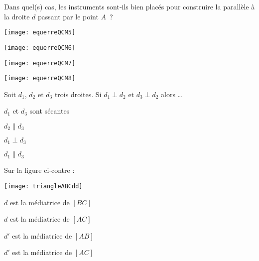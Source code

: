  
 \begin{QCM}
  \begin{GroupeQCM}  

    \begin{exercice}
     Dans quel(s) cas, les instruments sont‑ils bien placés pour construire la parallèle à la droite $d$ passant par le point $A$ ?
      \begin{ChoixQCM}{4}
      \item \texttt{[image: equerreQCM5]}
      \item \texttt{[image: equerreQCM6]}
      \item \texttt{[image: equerreQCM7]}
      \item \texttt{[image: equerreQCM8]}
      \end{ChoixQCM}
\begin{corrige}
   \end{corrige}
    \end{exercice}
  
  
    \begin{exercice}
     Soit $d_1$, $d_2$ et $d_3$ trois droites. Si $d_1 \perp d_2$ et $d_3 \perp d_2$ alors \ldots
      \begin{ChoixQCM}{4}
      \item $d_1$ et $d_3$ sont sécantes
      \item $d_2 \parallel d_3$
      \item $d_1 \perp d_3$
      \item $d_1 \parallel d_3$
      \end{ChoixQCM}
\begin{corrige}
   \end{corrige}
    \end{exercice}
    
    
  \begin{exercice}
     Sur la figure ci-contre : \vspace{-2em}\begin{center}\texttt{[image: triangleABCdd]}\end{center}\vspace{-1em}
      \begin{ChoixQCM}{4}
      \item $d$ est la médiatrice de $[BC]$
      \item $d$ est la médiatrice de $[AC]$
      \item $d'$ est la médiatrice de $[AB]$
      \item $d'$ est la médiatrice de $[AC]$
      \end{ChoixQCM}
\begin{corrige}
   \end{corrige}
    \end{exercice}


\end{GroupeQCM}
\end{QCM}
